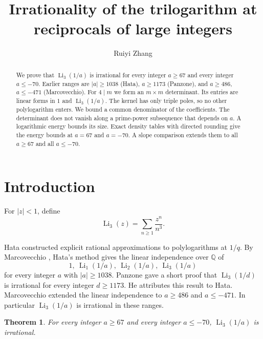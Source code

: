 \documentclass{amsart}
\newtheorem{theorem}{Theorem}
\numberwithin{equation}{section}
\numberwithin{table}{section}
\begin{document}
\title{Irrationality of the trilogarithm at reciprocals of large integers}
\author{Ruiyi Zhang}
\address{Independent Researcher, Columbia, Maryland, USA}

\begin{abstract}
We prove that $\operatorname{Li}_3(1/a)$ is irrational for every integer
$a\ge67$ and every integer $a\le-70$. Earlier ranges are $|a|\ge1038$ (Hata), $a\ge1173$
(Panzone), and $a\ge486$, $a\le-471$ (Marcovecchio). For $4\mid m$ we form
an $m\times m$ determinant. Its entries are linear forms in $1$ and
$\operatorname{Li}_3(1/a)$. The
kernel has only triple poles, so no other polylogarithm enters. We bound a
common denominator of the coefficients. The determinant does not vanish along a
prime-power subsequence that depends on $a$. A logarithmic energy bounds
its size. Exact density tables with directed rounding give the
energy bounds at $a=67$ and $a=-70$. A slope comparison extends them to all
$a\ge67$ and all $a\le-70$.
\end{abstract}

\maketitle

\section{Introduction}

For $|z|<1$, define
\[
\operatorname{Li}_3(z)=\sum_{n\ge1}\frac{z^n}{n^3}.
\]

Hata \cite{Hata} constructed explicit rational approximations to
polylogarithms at $1/q$. By Marcovecchio \cite[p.~229]{Marcovecchio},
Hata's method \cite[Corollary~2.2]{Hata} gives the linear independence
over $\mathbb Q$ of
\[
1,\ \operatorname{Li}_1(1/a),\ \operatorname{Li}_2(1/a),\
\operatorname{Li}_3(1/a)
\]
for every integer $a$ with $|a|\ge1038$. Panzone
\cite[Theorem~2, p.~108]{Panzone} gave a short proof that
$\operatorname{Li}_3(1/d)$ is irrational for every integer $d\ge1173$. He
attributes this result to Hata. Marcovecchio
\cite[Theorem~7.1, p.~228; p.~229]{Marcovecchio} extended the linear
independence to $a\ge486$ and $a\le-471$. In particular
$\operatorname{Li}_3(1/a)$ is irrational in these ranges.

\begin{theorem}\label{thm:main}
For every integer $a\ge67$ and every integer $a\le-70$,
$\operatorname{Li}_3(1/a)$ is irrational.
\end{theorem}
\end{document}
